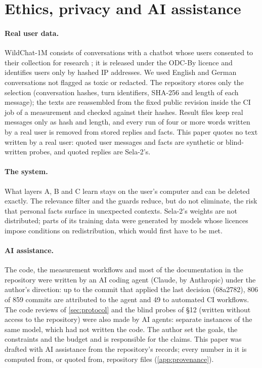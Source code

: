 \documentclass[10pt,twocolumn]{article}
\begin{document}
\section{Ethics, privacy and AI assistance}\label{sec:ethics}

\paragraph{Real user data.} WildChat-1M consists of conversations with a chatbot whose users consented to their
collection for research \citep{zhao2024wildchat}; it is released under the ODC-By licence and identifies users only by hashed IP addresses. We
used English and German conversations not flagged as toxic or redacted. The repository stores only the selection
(conversation hashes, turn identifiers, SHA-256 and length of each message); the texts are reassembled from the fixed
public revision inside the CI job of a measurement and checked against their hashes. Result files keep real messages
only as hash and length, and every run of four or more words written by a real user is removed from stored replies and
facts. This paper quotes no text written by a real user: quoted user messages and facts are synthetic or
blind-written probes, and quoted replies are Sela-2's.

\paragraph{The system.} What layers A, B and C learn stays on the user's computer and can be deleted exactly. The
relevance filter and the guards reduce, but do not eliminate, the risk that personal facts surface in unexpected
contexts. Sela-2's weights are not distributed; parts of its training data were generated by models whose licences
impose conditions on redistribution, which would first have to be met.

\paragraph{AI assistance.} The code, the measurement workflows and most of the documentation in the repository were
written by an AI coding agent (Claude, by Anthropic) under the author's direction: up to the commit that applied
the last decision (68a2782), 806 of 859 commits are attributed to the agent and 49 to automated CI workflows. The code
reviews of \cref{sec:protocol} and the blind probes of \S12 (written without access to the repository) were also made
by AI agents: separate instances of the same model, which had not written the code. The author set the goals, the
constraints and the budget and is responsible for the claims. This paper was drafted with
AI assistance from the repository's records; every number in it is computed from, or quoted from, repository files
(\cref{app:provenance}).
\end{document}
